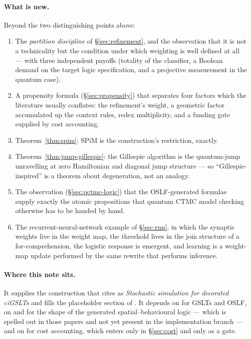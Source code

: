 \documentclass[11pt,a4paper]{article}
\theoremstyle{plain}
\theoremstyle{definition}
\theoremstyle{remark}
\begin{document}
\paragraph{What is new.} Beyond the two distinguishing points above:
\begin{enumerate}[label=(\roman*),leftmargin=2.2em]
\item The \emph{partition discipline} of \S\ref{sec:refinement}, and the observation that it is not
a technicality but the condition under which weighting is well defined at all --- with three
independent payoffs (totality of the classifier, a Boolean demand on the target logic
specification, and a projective measurement in the quantum case).
\item A propensity formula (\S\ref{sec:propensity}) that separates four factors which the literature
usually conflates: the refinement's weight, a geometric factor accumulated up the context rules,
redex multiplicity, and a funding gate supplied by cost accounting.
\item Theorem~\ref{thm:spim}: SPiM is the construction's restriction, exactly.
\item Theorem~\ref{thm:jump-gillespie}: the Gillespie algorithm is the quantum-jump unravelling at
zero Hamiltonian and diagonal jump structure --- so ``Gillespie-inspired'' is a theorem about
degeneration, not an analogy.
\item The observation (\S\ref{sec:qctmc-logic}) that the OSLF-generated formulae supply exactly the
atomic propositions that quantum CTMC model checking otherwise has to be handed by hand.
\item The recurrent-neural-network example of \S\ref{sec:rnn}, in which the synaptic weights live in
the weight map, the threshold lives in the join structure of a for-comprehension, the logistic
response is emergent, and learning is a weight-map update performed by the same rewrite that
performs inference.
\end{enumerate}

\paragraph{Where this note sits.} It supplies the construction that \cite{scientist} cites as
\emph{Stochastic simulation for decorated ciGSLTs} and fills the placeholder section of
\cite{mettacalc}. It depends on \cite{omnibus} for GSLTs and OSLF, on \cite{classifier} and
\cite{scientist} for the shape of the generated spatial--behavioural logic --- which is spelled out
in those papers and not yet present in the implementation branch --- and on \cite{costmonad} for
cost accounting, which enters only in \S\ref{sec:cost} and only as a gate.
\end{document}
